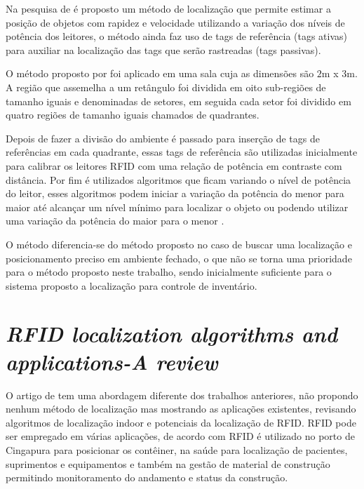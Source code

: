 Na pesquisa de  é proposto um método de localização que permite estimar a posição de objetos 
com rapidez e velocidade utilizando a variação dos níveis de potência dos leitores, o método ainda faz uso de tags de 
referência (tags ativas) para auxiliar na localização das tags  que serão rastreadas (tags passivas).


O método proposto por  foi aplicado em uma sala cuja as dimensões são $2$m x $3$m. 
A região que assemelha a um retângulo foi dividida em oito sub-regiões de tamanho iguais e denominadas de setores, 
em seguida cada setor foi dividido em quatro regiões de tamanho iguais chamados de quadrantes.

\par
Depois de fazer a divisão do ambiente é passado para inserção de tags de referências em cada quadrante, 
essas tags de referência são utilizadas inicialmente para calibrar os leitores RFID com uma relação de potência em 
contraste com distância. Por fim é utilizados algoritmos que ficam variando o nível de potência do leitor, esses algoritmos 
podem iniciar a variação da potência do menor para maior até alcançar um nível mínimo para localizar o objeto ou podendo utilizar 
uma variação da potência do maior para o menor \cite{localization2010}.

\par
O método  diferencia-se do método proposto no caso de buscar uma localização e posicionamento 
preciso em ambiente fechado, o que não se torna uma prioridade para o método proposto neste trabalho, sendo inicialmente suficiente 
para o sistema proposto a localização para controle de inventário.


\section{\textit{RFID localization algorithms and applications-A review}}

O artigo de  tem uma abordagem diferente dos trabalhos anteriores, não propondo nenhum método de 
localização mas mostrando as aplicações existentes, revisando algoritmos de localização indoor e potenciais da 
localização de RFID.
%
RFID pode ser empregado em várias aplicações, de acordo com  RFID é utilizado no porto de 
Cingapura para posicionar os contêiner, na saúde para localização de pacientes, suprimentos e equipamentos e também na gestão de 
material de construção permitindo monitoramento do andamento e status da construção.

